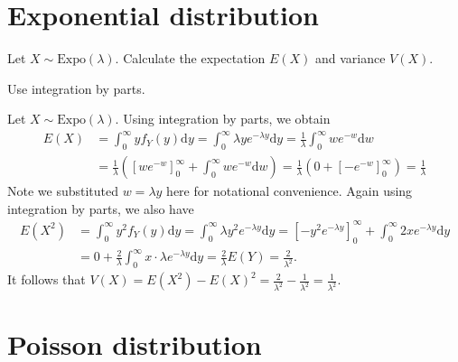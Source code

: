 \section{Exponential distribution}
\label{sec:section-5.7}
	
	\begin{exercise}\label{ex:chap05:01}
		Let $X \sim \text{Expo} (\lambda)$. Calculate the expectation $E(X)$ and variance $V(X)$.
		\begin{hint}
			Use integration by parts.
		\end{hint}
		\begin{solution}
			Let $X \sim \text{Expo} (\lambda)$. Using integration by parts, we obtain
			\begin{align*}
				E(X) & = \int_0^{\infty} y f_Y(y) \mathrm{d}y = \int_0^{\infty} \lambda y e^{- \lambda y} \mathrm{d}y = \frac{1}{\lambda} \int_0^{\infty} w e^{- w} \mathrm{d}w \\
				& = \frac{1}{\lambda} \left(\left[w e^{- w}\right]_0^{\infty} +\int_0^{\infty} w e^{- w} \mathrm{d}w\right) = \frac{1}{\lambda} \left(0 + \left[-e^{- w} \right]_0^{\infty}\right) = \frac{1}{\lambda}
			\end{align*}
			Note we substituted $w = \lambda y$ here for notational convenience. Again using integration by parts, we also have
			\begin{align*}
				E(X^2) & = \int_0^{\infty} y^2 f_Y(y) \mathrm{d}y = \int_0^{\infty} \lambda y^2 e^{- \lambda y} \mathrm{d}y = \left[-y^2 e^{- \lambda y}\right]_0^{\infty} + \int_0^{\infty} 2x e^{- \lambda y} \mathrm{d}y \\
				& = 0 + \frac{2}{\lambda} \int_0^{\infty} x \cdot \lambda e^{- \lambda y} \mathrm{d}y = \frac{2}{\lambda} E(Y) = \frac{2}{\lambda^2}.
			\end{align*}
			It follows that $V(X) = E(X^2) - E(X)^2 = \frac{2}{\lambda^2} - \frac{1}{\lambda^2} = \frac{1}{\lambda^2}$.
		\end{solution}
	\end{exercise}

\section{Poisson distribution}
\label{sec:section-5.8}
	
